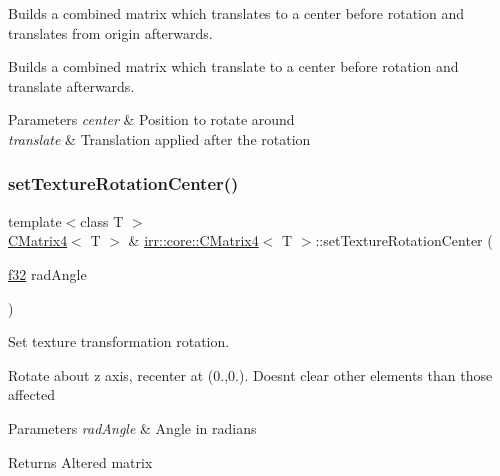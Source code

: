 Builds a combined matrix which translates to a center before rotation and translates from origin afterwards. 

Builds a combined matrix which translate to a center before rotation and translate afterwards.


\begin{DoxyParams}{Parameters}
{\em center} & Position to rotate around \\
\hline
{\em translate} & Translation applied after the rotation \\
\hline
\end{DoxyParams}
\mbox{\label{classirr_1_1core_1_1CMatrix4_a445a7653292ae4ffb0baa50032a8674e}} 
\subsubsection{\texorpdfstring{set\+Texture\+Rotation\+Center()}{setTextureRotationCenter()}}
{\footnotesize\ttfamily template$<$class T $>$ \\
\hyperlink{classirr_1_1core_1_1CMatrix4}{C\+Matrix4}$<$ T $>$ \& \hyperlink{classirr_1_1core_1_1CMatrix4}{irr\+::core\+::\+C\+Matrix4}$<$ T $>$\+::set\+Texture\+Rotation\+Center (\begin{DoxyParamCaption}\item[{\hyperlink{namespaceirr_a0277be98d67dc26ff93b1a6a1d086b07}{f32}}]{rad\+Angle }\end{DoxyParamCaption})\hspace{0.3cm}{\ttfamily [inline]}}



Set texture transformation rotation. 

Rotate about z axis, recenter at (0.,0.). Doesn\textquotesingle{}t clear other elements than those affected 
\begin{DoxyParams}{Parameters}
{\em rad\+Angle} & Angle in radians \\
\hline
\end{DoxyParams}
\begin{DoxyReturn}{Returns}
Altered matrix 
\end{DoxyReturn}
\mbox{\label{classirr_1_1core_1_1CMatrix4_aed32a7a8da9c4cee5babe8f6b4aa7dd4}} 
